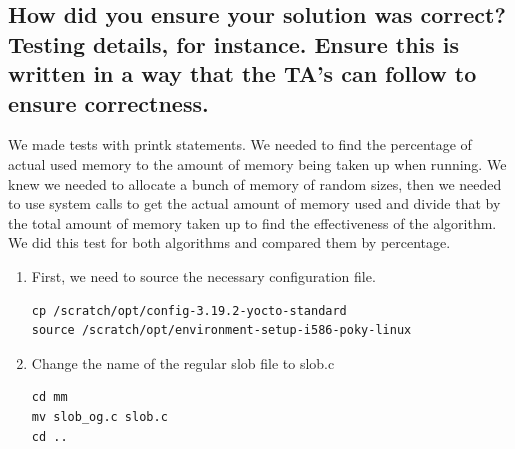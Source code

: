 \documentclass[draftclsnofoot, onecolumn, compsoc, 10pt]{IEEEtran}
\begin{document}
    \subsection{How did you ensure your solution was correct? Testing details, for instance. Ensure this is written in a way that the TA's can follow to ensure correctness.}
    We made tests with printk statements. We needed to find the percentage of actual used memory to the amount of memory being taken up when running. We knew we needed to allocate a bunch of memory of random sizes, then we needed to use system calls to get the actual amount of memory used and divide that by the total amount of memory taken up to find the effectiveness of the algorithm. We did this test for both algorithms and compared them by percentage.\\
  \begin{enumerate}
            \item First, we need to source the necessary configuration file.\\

\begin{lstlisting}
cp /scratch/opt/config-3.19.2-yocto-standard
source /scratch/opt/environment-setup-i586-poky-linux
\end{lstlisting}
            \item Change the name of the regular slob file to slob.c
\begin{lstlisting}
cd mm
mv slob_og.c slob.c
cd ..
\end{lstlisting}


\end{enumerate}
\end{document}
